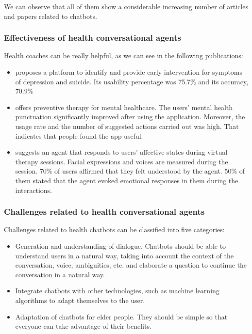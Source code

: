 \documentclass[12pt,english]{article}
\begin{document}
We can observe that all of them show a considerable increasing number of articles and papers related to chatbots.







\subsubsection{Effectiveness of health conversational agents}

Health coaches can be really helpful, as we can see in the following publications:

\begin{itemize}
  \item \cite{Breso2016297} proposes a platform to identify and provide early intervention for symptoms of depression and suicide. Its usability percentage was 75.7\% and its accuracy, 70.9\%
  \item \cite{Hirano2017} offers preventive therapy for mental healthcare. The users' mental health punctuation significantly improved after using the application. Moreover, the usage rate and the number of suggested actions carried out was high. That indicates that people found the app useful.
  \item \cite{Ring2016} suggests an agent that responds to users' affective states during virtual therapy sessions. Facial expressions and voices are measured during the session. 70\% of users affirmed that they felt understood by the agent. 50\% of them stated that the agent evoked emotional responses in them during the interactions.
\end{itemize}

\subsubsection{Challenges related to health conversational agents}

Challenges related to health chatbots can be classified into five categories:
\begin{itemize}
  \item Generation and understanding of dialogue. Chatbots should be able to understand users in a natural way, taking into account the context of the conversation, voice, ambiguities, etc. and elaborate a question to continue the conversation in a natural way.
  \item Integrate chatbots with other technologies, such as machine learning algorithms to adapt themselves to the user.
  \item Adaptation of chatbots for elder people. They should be simple so that everyone can take advantage of their benefits.
\end{itemize}
\end{document}
